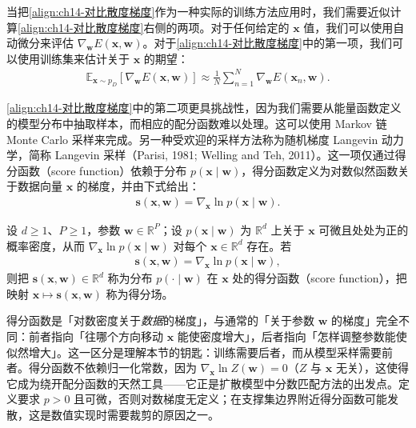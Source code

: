 \documentclass[../../main.tex]{subfiles}
\begin{document}
当把\eqref{align:ch14-对比散度梯度}作为一种实际的训练方法应用时，我们需要近似计算\eqref{align:ch14-对比散度梯度}右侧的两项。对于任何给定的 $\bm{x}$ 值，我们可以使用自动微分来评估 $\nabla_{\bm{w}}E(\bm{x},\bm{w})$。对于\eqref{align:ch14-对比散度梯度}中的第一项，我们可以使用训练集来估计关于 $\bm{x}$ 的期望：
\begin{align}
\mathbb{E}_{\bm{x}\sim p_{D}}\left[\nabla_{\bm{w}}E(\bm{x},\bm{w})\right]\approx\frac{1}{N}\sum_{n=1}^{N}\nabla_{\bm{w}}E\!\left(\bm{x}_{n},\bm{w}\right).
\label{align:ch14-数据期望}
\end{align}

\eqref{align:ch14-对比散度梯度}中的第二项更具挑战性，因为我们需要从能量函数定义的模型分布中抽取样本，而相应的配分函数难以处理。这可以使用 Markov 链 Monte Carlo 采样来完成。另一种受欢迎的采样方法称为随机梯度 Langevin 动力学，简称 Langevin 采样（Parisi, 1981; Welling and Teh, 2011）。这一项仅通过得分函数（score function）依赖于分布 $p(\bm{x}\mid\bm{w})$，得分函数定义为对数似然函数关于数据向量 $\bm{x}$ 的梯度，并由下式给出：
\begin{align}
\bm{s}(\bm{x},\bm{w})=\nabla_{\bm{x}}\ln p(\bm{x}\mid\bm{w}).
\label{align:ch14-得分函数}
\end{align}

\begin{definition}[得分函数]\label{definition:ch14-得分函数}
设 $d\geqslant1$、$P\geqslant1$，参数 $\bm{w}\in\mathbb{R}^{P}$；设 $p(\bm{x}\mid\bm{w})$ 为 $\mathbb{R}^{d}$ 上关于 $\bm{x}$ 可微且处处为正的概率密度，从而 $\nabla_{\bm{x}}\ln p(\bm{x}\mid\bm{w})$ 对每个 $\bm{x}\in\mathbb{R}^{d}$ 存在。若
\begin{align*}
\bm{s}(\bm{x},\bm{w})=\nabla_{\bm{x}}\ln p(\bm{x}\mid\bm{w}),
\end{align*}
则把 $\bm{s}(\bm{x},\bm{w})\in\mathbb{R}^{d}$ 称为分布 $p(\cdot\mid\bm{w})$ 在 $\bm{x}$ 处的得分函数（score function），把映射 $\bm{x}\mapsto\bm{s}(\bm{x},\bm{w})$ 称为得分场。
\end{definition}

\begin{remark}得分函数是「对数密度关于\emph{数据}的梯度」，与通常的「关于参数 $\bm{w}$ 的梯度」完全不同：前者指向「往哪个方向移动 $\bm{x}$ 能使密度增大」，后者指向「怎样调整参数能使似然增大」。这一区分是理解本节的钥匙：训练需要后者，而从模型采样需要前者。得分函数不依赖归一化常数，因为 $\nabla_{\bm{x}}\ln Z(\bm{w})=0$（$Z$ 与 $\bm{x}$ 无关），这使得它成为绕开配分函数的天然工具——它正是扩散模型中分数匹配方法的出发点。定义要求 $p>0$ 且可微，否则对数梯度无定义；在支撑集边界附近得分函数可能发散，这是数值实现时需要裁剪的原因之一。
\end{remark}
\end{document}
